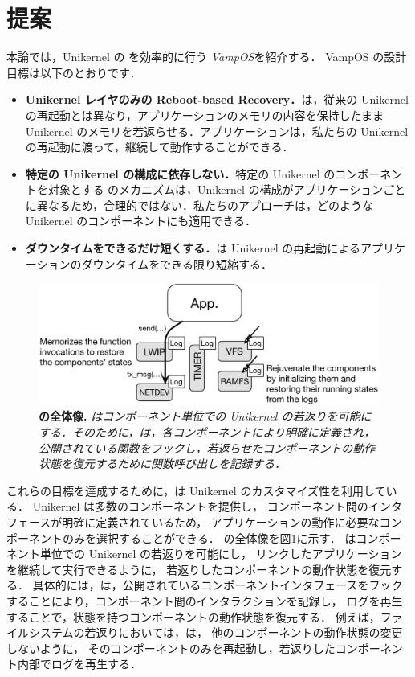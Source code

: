 \section{提案} \label{section:proposal}

本論では，Unikernel の \rr を効率的に行う \emph{VampOS}を紹介する．
VampOS の設計目標は以下のとおりです．

\begin{itemize}
    \item \textbf{Unikernel レイヤのみの Reboot-based Recovery．}{\sysname は，従来の Unikernel の再起動とは異なり，アプリケーションのメモリの内容を保持したまま Unikernel のメモリを若返らせる．アプリケーションは，私たちの Unikernel の再起動に渡って，継続して動作することができる．}
    \item \textbf{特定の Unikernel の構成に依存しない．}{特定の Unikernel のコンポーネントを対象とする \rr のメカニズムは，Unikernel の構成がアプリケーションごとに異なるため，合理的ではない．私たちのアプローチは，どのような Unikernel のコンポーネントにも適用できる．}
    \item \textbf{ダウンタイムをできるだけ短くする．}{\sysname は Unikernel の再起動によるアプリケーションのダウンタイムをできる限り短縮する．}
\end{itemize}

\begin{figure}[t]
    \begin{center}
      \includegraphics[scale=0.3]{./img/vampos.eps}
      \caption{\textbf{{\sysname} の全体像.} \textit{{\sysname} はコンポーネント単位での Unikernel の若返りを可能にする．そのために，\sysname は，各コンポーネントにより明確に定義され，公開されている関数をフックし，若返らせたコンポーネントの動作状態を復元するために関数呼び出しを記録する．}}
      \label{fig:overview}
    \end{center}
\end{figure}

これらの目標を達成するために，\sysname は Unikernel のカスタマイズ性を利用している．
Unikernel は多数のコンポーネントを提供し，
コンポーネント間のインタフェースが明確に定義されているため，
アプリケーションの動作に必要なコンポーネントのみを選択することができる．
\sysname の全体像を図\ref{fig:overview}に示す．
\sysname はコンポーネント単位での Unikernel の若返りを可能にし，
リンクしたアプリケーションを継続して実行できるように，
若返りしたコンポーネントの動作状態を復元する．
具体的には，\sysname は，公開されているコンポーネントインタフェースをフックすることにより，コンポーネント間のインタラクションを記録し，
ログを再生することで，状態を持つコンポーネントの動作状態を復元する．
例えば，ファイルシステムの若返りにおいては，\sysname は，
他のコンポーネントの動作状態の変更しないように，
そのコンポーネントのみを再起動し，若返りしたコンポーネント内部でログを再生する．

